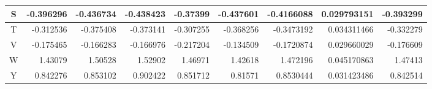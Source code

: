 \begin{tabular}{|c|r|r|r|r|r|r|r|r|}
\hline
S & -0.396296 & -0.436734 & -0.438423 & -0.37399 & -0.437601 & -0.4166088 & 0.029793151 & -0.393299\\
\hline
T & -0.312536 & -0.375408 & -0.373141 & -0.307255 & -0.368256 & -0.3473192 & 0.034311466 & -0.332279\\
\hline
V & -0.175465 & -0.166283 & -0.166976 & -0.217204 & -0.134509 & -0.1720874 & 0.029660029 & -0.176609\\
\hline
W & 1.43079 & 1.50528 & 1.52902 & 1.46971 & 1.42618 & 1.472196 & 0.045170863 & 1.47413\\
\hline
Y & 0.842276 & 0.853102 & 0.902422 & 0.851712 & 0.81571 & 0.8530444 & 0.031423486 & 0.842514\\
\hline

\end{tabular}

